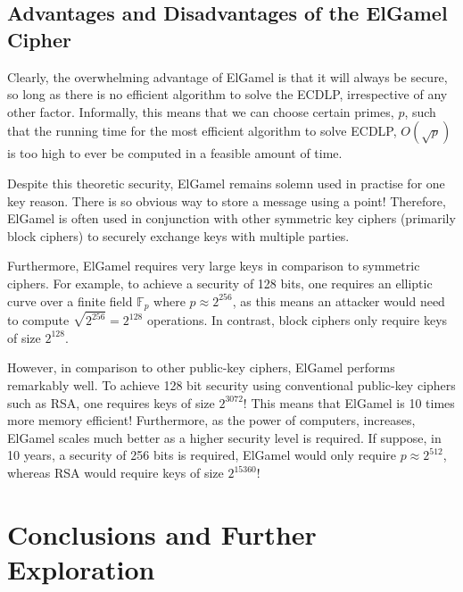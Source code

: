 \documentclass[12pt, a4paper, final]{report}
\begin{document}
\subsection{Advantages and Disadvantages of the ElGamel Cipher}

Clearly, the overwhelming advantage of ElGamel is that it will always be secure,
so long as there is no efficient algorithm to solve the ECDLP, irrespective
of any other factor. Informally,
this means that we can choose certain primes, $p$, such that the running time
for the most efficient algorithm to solve ECDLP, $O(\sqrt{p})$ is too high to
ever be computed in a feasible amount of time.

Despite this theoretic security, ElGamel remains solemn used in practise for
one key reason. There is so obvious way to store a message using a point!
Therefore, ElGamel is often used in conjunction with other symmetric key ciphers
(primarily block ciphers) to securely exchange keys with multiple parties.

Furthermore, ElGamel requires very large keys in comparison to symmetric
ciphers. For example, to achieve a security of 128 bits, one requires an elliptic
curve over a finite field $\mathds{F}_p$ where $p \approx 2^{256}$, as this
means an attacker would need to compute $\sqrt{2^{256}} = 2^{128}$ operations.
In contrast, block ciphers only require keys of size $2^{128}$.

However, in comparison to other public-key ciphers, ElGamel performs remarkably
well. To achieve 128 bit security using conventional public-key ciphers
such as RSA, one requires keys of size $2^{3072}$! This means that ElGamel
is 10 times more memory efficient! Furthermore, as the power of computers,
increases, ElGamel scales much better as a higher security level is required.
If suppose, in 10 years, a security of 256 bits is required, ElGamel would
only require $p \approx 2^{512}$, whereas RSA would require keys of size
$2^{15360}$!

\section*{Conclusions and Further Exploration}
\end{document}
